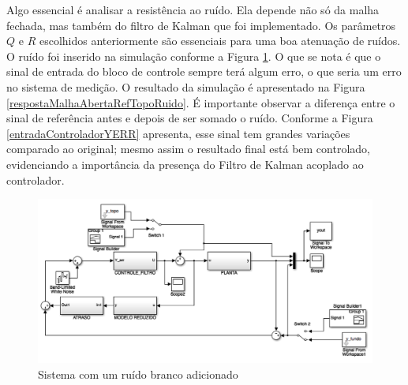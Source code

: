 Algo essencial é analisar a resistência ao ruído. Ela depende não só da malha fechada, mas também do filtro de Kalman que foi implementado. Os parâmetros $Q$ e $R$ escolhidos anteriormente são essenciais para uma boa atenuação de ruídos. O ruído foi inserido na simulação conforme a Figura \ref{simulacaoComRuidoSimulink}. O que se nota é que o sinal de entrada do bloco de controle sempre terá algum erro, o que seria um erro no sistema de medição. O resultado da simulação é apresentado na Figura \ref{respostaMalhaAbertaRefTopoRuido}. É importante observar a diferença entre o sinal de referência antes e depois de ser somado o ruído. Conforme a Figura \ref{entradaControladorYERR} apresenta, esse sinal tem grandes variações comparado ao original; mesmo assim o resultado final está bem controlado, evidenciando a importância da presença do Filtro de Kalman acoplado ao controlador. 

\begin{figure}[!ht]
\centering
\caption{Sistema com um ruído branco adicionado\label{simulacaoComRuidoSimulink}}
\includegraphics[width=0.8\linewidth]{figs/resultados/simulacao/simulacaoComRuido}
\end{figure}


